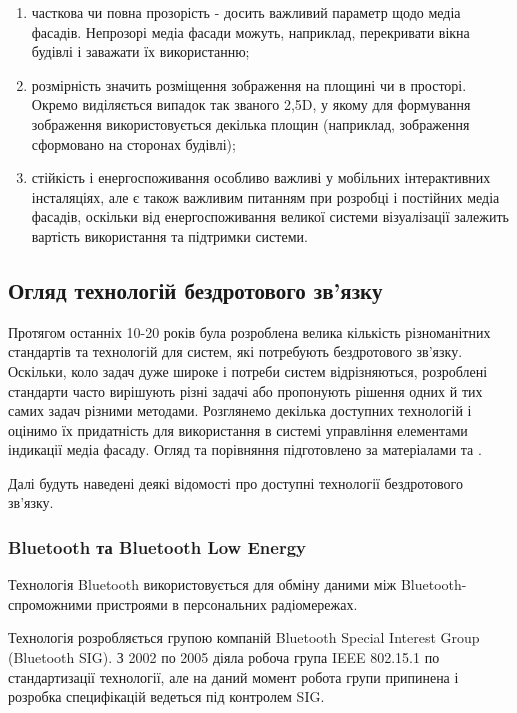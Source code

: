 \documentclass[a4paper,ukrainian,utf8,nocolumnsxix,floatsection,equationsection]{eskdtext}
\renewcommand\paragraph{\subsubsection}
\begin{document}
\begin{enumerate}
	\item часткова чи повна прозорість - досить важливий параметр щодо медіа фасадів. Непрозорі медіа фасади можуть, наприклад, перекривати вікна будівлі і заважати їх використанню;
	\item розмірність значить розміщення зображення на площині чи в просторі. Окремо виділяється випадок так званого 2,5D, у якому для формування зображення використовується декілька площин (наприклад, зображення сформовано на сторонах будівлі);
	\item стійкість і енергоспоживання особливо важливі у мобільних інтерактивних інсталяціях, але є також важливим питанням при розробці і постійних медіа фасадів, оскільки від енергоспоживання великої системи візуалізації залежить вартість використання та підтримки системи.
\end{enumerate}


\subsection{Огляд технологій бездротового зв’язку}

Протягом останніх 10-20 років була розроблена велика кількість різноманітних стандартів та технологій для систем, які потребують бездротового зв’язку. Оскільки, коло задач дуже широке і потреби систем відрізняються, розроблені стандарти часто вирішують різні задачі або пропонують рішення одних й тих самих задач різними методами. Розглянемо декілька доступних технологій і оцінимо їх придатність для використання в системі управління елементами індикації медіа фасаду. Огляд та порівняння підготовлено за матеріалами \cite{comparative:wireless:protocols} та \cite{garcia2008:problem:solving}.

Далі будуть наведені деякі відомості про доступні технології бездротового зв’язку.

\paragraph{Bluetooth та Bluetooth Low Energy} %
\label{par:bluetooth_bluetooth_low_energy}

Технологія Bluetooth використовується для обміну даними між Bluetooth-спроможними пристроями в персональних радіомережах. 

Технологія розробляється групою компаній Bluetooth Special Interest Group (Bluetooth SIG). З 2002 по 2005 діяла робоча група IEEE 802.15.1 по стандартизації технології, але на даний момент робота групи припинена і розробка специфікацій ведеться під контролем SIG.
\end{document}
